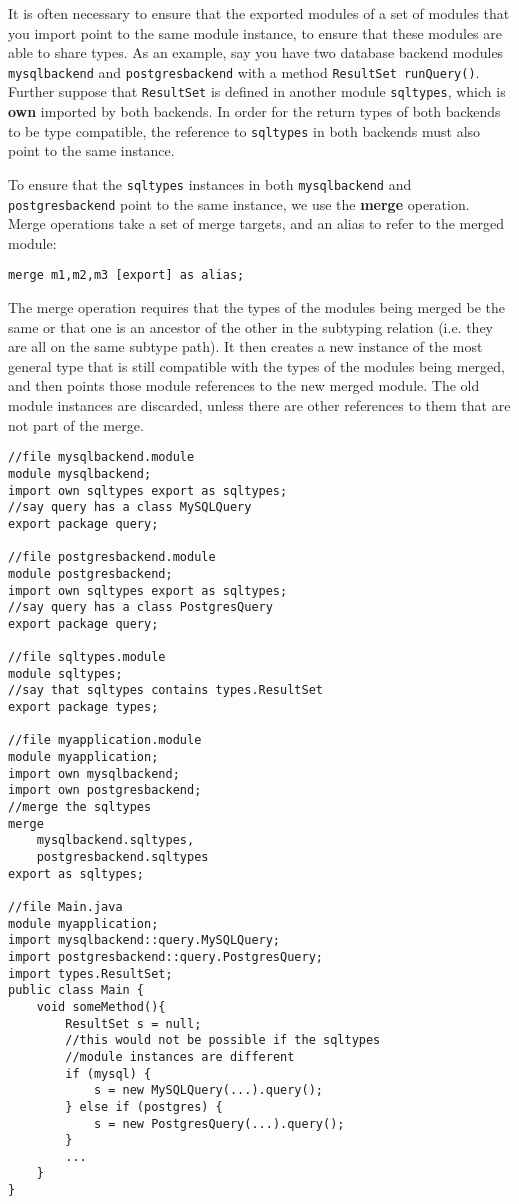 
It is often necessary to ensure that the exported modules of a set of modules
that you import point to the same module instance, to ensure that these
modules are able to share types. As an example, say you have two database
backend modules {\tt mysqlbackend} and {\tt postgresbackend} with a method
{\tt ResultSet runQuery()}. Further suppose that {\tt ResultSet} is
defined in another module {\tt sqltypes}, which is \textbf{own} imported by both backends.
In order for the return types of both backends to be type compatible, the
reference to {\tt sqltypes} in both backends must also point to the same
instance.

To ensure that the {\tt sqltypes} instances in both {\tt mysqlbackend}
and {\tt postgresbackend} point to the same instance, we use the 
\textbf{merge} operation. Merge operations take a set of merge targets,
and an alias to refer to the merged module:

\begin{lstlisting}
merge m1,m2,m3 [export] as alias;
\end{lstlisting}

The merge operation requires that the types
of the modules being merged be the same or that one is an ancestor of
the other in the subtyping relation (i.e. they are all on the same subtype path). 
It then creates a new instance
of the most general type that is still compatible with the types of the
modules being merged, and then points those module references to the new 
merged module. The old module instances are discarded, unless there
are other references to them that are not part of the merge.

\begin{lstlisting}[caption=Merge]
//file mysqlbackend.module
module mysqlbackend;
import own sqltypes export as sqltypes;
//say query has a class MySQLQuery
export package query;

//file postgresbackend.module
module postgresbackend;
import own sqltypes export as sqltypes;
//say query has a class PostgresQuery
export package query;

//file sqltypes.module
module sqltypes;
//say that sqltypes contains types.ResultSet
export package types;

//file myapplication.module
module myapplication;
import own mysqlbackend;
import own postgresbackend;
//merge the sqltypes
merge 
	mysqlbackend.sqltypes, 
	postgresbackend.sqltypes 
export as sqltypes;

//file Main.java
module myapplication;
import mysqlbackend::query.MySQLQuery;
import postgresbackend::query.PostgresQuery;
import types.ResultSet;
public class Main {
	void someMethod(){
		ResultSet s = null;
		//this would not be possible if the sqltypes
		//module instances are different
		if (mysql) {
			s = new MySQLQuery(...).query();
		} else if (postgres) {
			s = new PostgresQuery(...).query();
		}
		...
	}
}
\end{lstlisting}


